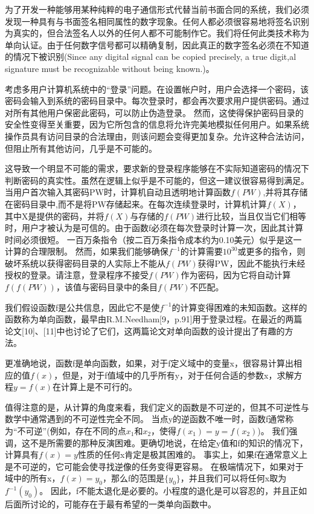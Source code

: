 \documentclass[]{article}
\begin{document}
	为了开发一种能够用某种纯粹的电子通信形式代替当前书面合同的系统，我们必须发现一种具有与书面签名相同属性的数字现象。任何人都必须很容易地将签名识别为真实的，但合法签名人以外的任何人都不可能制作它。我们将任何此类技术称为单向认证。由于任何数字信号都可以精确复制，因此真正的数字签名必须在不知道的情况下被识别(Since any digital signal can be copied precisely, a true digit,al signature must be recognizable without being known.)。
	
	考虑多用户计算机系统中的“登录”问题。在设置帐户时，用户会选择一个密码，该密码会输入到系统的密码目录中。每次登录时，都会再次要求用户提供密码。通过对所有其他用户保密此密码，可以防止伪造登录。
	然而，这使得保护密码目录的安全性变得至关重要，因为它所包含的信息将允许完美地模拟任何用户。如果系统操作员具有访问目录的合法理由，则该问题会变得更加复杂。允许这种合法访问，但阻止所有其他访问，几乎是不可能的。
	
	
	这导致一个明显不可能的需求，要求新的登录程序能够在不实际知道密码的情况下判断密码的真实性。虽然在逻辑上似乎是不可能的，但这一建议很容易得到满足。
	当用户首次输入其密码PW时，计算机自动且透明地计算函数$f(PW)$,并将其存储在密码目录中,而不是将PW存储起来。在每次连续登录时，计算机计算$f(X)$，其中X是提供的密码，并将$f(X)$与存储的$f(PW)$进行比较，当且仅当它们相等时，用户才被认为是可信的。由于函数f必须在每次登录时计算一次，因此其计算时间必须很短。
	一百万条指令（按二百万条指令成本约为0.10美元）似乎是这一计算的合理限制。
	然而，如果我们能够确保$f^{-1}$的计算需要$10^{30}$或更多的指令，则破坏系统以获得密码目录的人实际上不能从$f(PW)$获得PW，因此不能执行未经授权的登录。请注意，登录程序不接受$f(PW)$作为密码，因为它将自动计算$f(f(PW))$，该值与密码目录中的条目$f(PW)$不匹配。
	
	
	我们假设函数f是公共信息，因此它不是使$f^{-1}$的计算变得困难的未知函数。这样的函数称为单向函数，最早由R.M.Needham[9，p.91]用于登录过程。在最近的两篇论文[10]、[11]中也讨论了它们，这两篇论文对单向函数的设计提出了有趣的方法。
	
	
	更准确地说，函数f是单向函数，如果，对于f定义域中的变量x，很容易计算出相应的值$f(x)$，但是，对于f值域中的几乎所有y，对于任何合适的参数x，求解方程$y=f(x)$在计算上是不可行的。
	
	
	值得注意的是，从计算的角度来看，我们定义的函数是不可逆的，但其不可逆性与数学中通常遇到的不可逆性完全不同。
	当点y的逆函数不唯一时，函数f通常称为“不可逆”(例如，存在不同的点$x_1$和$x_2$，使得$f(x_1)=y=f(x_2)$)。
	我们强调，这不是所需要的那种反演困难。更确切地说，在给定y值和f的知识的情况下，计算具有$f(x)=y$性质的任何x肯定是极其困难的。
	事实上，如果f在通常意义上是不可逆的，它可能会使寻找逆像的任务变得更容易。
	在极端情况下，如果对于域中的所有x，$f(x)=y_0$，那么f的范围是$\{y_0\}$，并且我们可以将任何x取为$f^{-1}(y_0)$。
	因此，f不能太退化是必要的。小程度的退化是可以容忍的，并且正如后面所讨论的，可能存在于最有希望的一类单向函数中。
	
\end{document}
